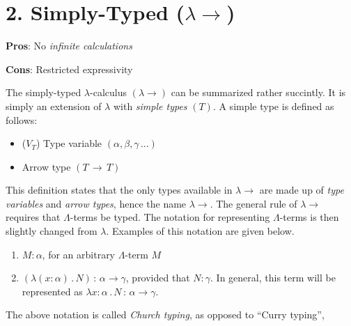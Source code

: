 \documentclass[9pt,preprint,nocopyrightspace,computermodern]{sigplanconf} %
\begin{document}
\section*{2. Simply-Typed (\(\lambda\!\!\rightarrow\))}
\begin{flushleft}
  \textbf{Pros}: No \textit{infinite calculations}
  \par
  \textbf{Cons}: Restricted expressivity
\end{flushleft}
The simply-typed \(\lambda\)-calculus \((\lambda\!\!\!\rightarrow)\) can be
summarized rather succintly. It is simply an extension of \(\lambda\) with
\textit{simple types} \((T)\). A simple type \cite{church} is defined as follows:
\begin{itemize}
\item (\(V_T\)) Type variable \((\alpha,\beta,\gamma\,...)\)
\item Arrow type \((T\,\rightarrow\,T)\)
\end{itemize}
This definition states that the only types available in \(\lambda\!\!\rightarrow\)
are made up of \textit{type variables} and \textit{arrow types}, hence the name
\(\lambda\!\!\rightarrow\). The general rule of \(\lambda\!\!\rightarrow\)
requires that \(\Lambda\)-terms be typed. The notation for representing
\(\Lambda\)-terms is then slightly changed from \(\lambda\). Examples of this
notation are given below.
\begin{enumerate}
  \item \(M : \alpha\), for an arbitrary \(\Lambda\)-term \(M\)
  \item \((\lambda (x : \alpha)\,.\,N)\,:\,\alpha\rightarrow\gamma\), provided that \(N : \gamma\).
    In general, this term will be represented as \(\lambda x : \alpha\,.\,N\,:\,\alpha\rightarrow\gamma\).
\end{enumerate}
The above notation is called \textit{Church typing}, as opposed to ``Curry typing'',
\end{document}
